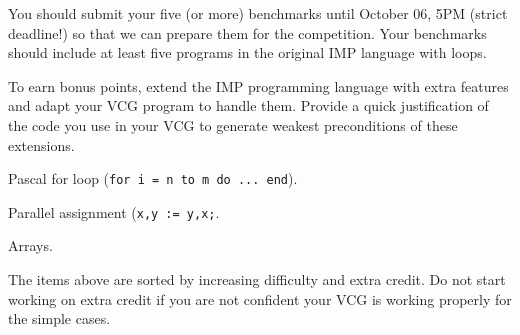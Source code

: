 \documentclass[11pt]{article}
\begin{document}
You should submit your five (or more) benchmarks until October 06, 5PM (strict
deadline!) so that we can prepare them for the competition.  Your benchmarks
should include at least five programs in the original IMP language with loops.

To earn bonus points, extend the IMP programming language with extra features
and adapt your VCG program to handle them.  Provide a quick justification of
the code you use in your VCG to generate weakest preconditions of these extensions.

\begin{iterate}
\item Pascal for loop (\texttt{for i = n to m do ... end}).
\item Parallel assignment (\texttt{x,y := y,x;}.
\item Arrays.
\end{iterate}

The items above are sorted by increasing difficulty and extra credit.
Do not start working on extra credit if you are not confident your
VCG is working properly for the simple cases.
\end{document}
